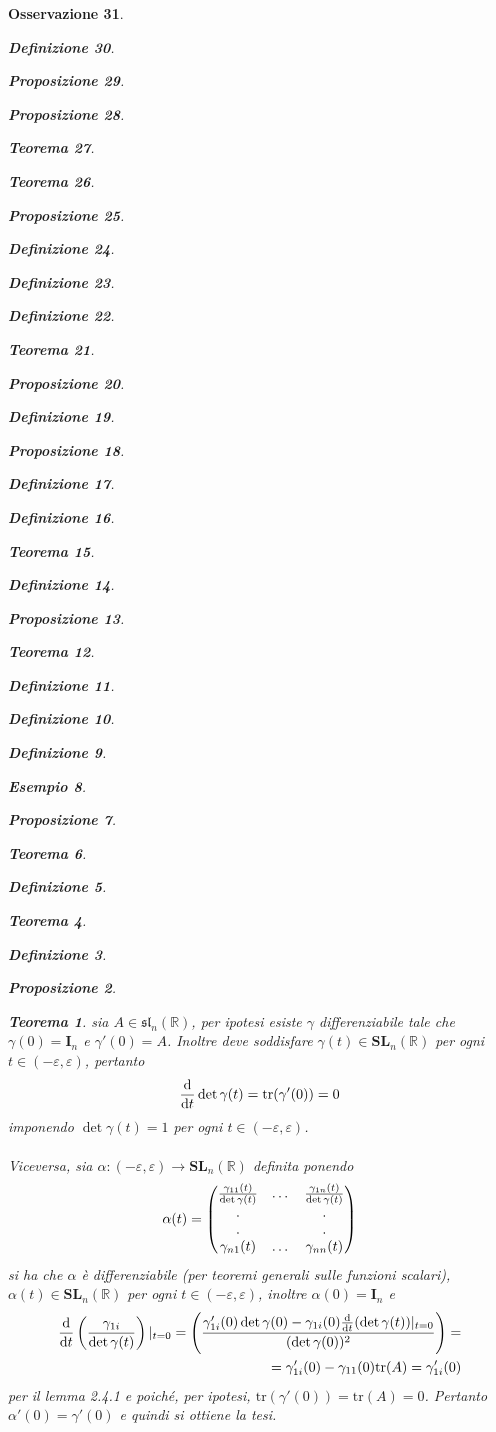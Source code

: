 \documentclass[oneside, 11pt]{amsbook}
\makeatletter
\newcommand{\0}{{(0)}}
\newcommand{\3}{{(3)}}
\theoremstyle{colonplain}
\newtheorem{thm}{Teorema}[chapter]
\newtheorem{prop}[thm]{Proposizione}
\theoremstyle{colondefinition}
\newtheorem{defn}[thm]{Definizione}
\newtheorem{ex}[thm]{Esempio}
\theoremstyle{colonremark}
\newtheorem{rmk}[thm]{Osservazione}
\numberwithin{equation}{chapter}
\renewcommand{\proofname}{Dimostrazione}
\renewenvironment{proof}[1][\proofname]{\par
  \pushQED{\end{proof}}%
  \normalfont \topsep6\p@\@plus6\p@\relax
  \trivlist
  \item[\hskip\labelsep\bfseries #1:]\ignorespaces
}{%
  \popQED\endtrivlist\@endpefalse
}
\makeatother
\begin{document}
\begin{rmk}
\begin{defn}
\begin{prop}
\begin{prop}
\begin{thm}
\begin{thm}
\begin{prop}
\begin{defn}
\begin{defn}
\begin{defn}
\begin{thm}
\begin{prop}
\begin{defn}
\begin{prop}
\begin{defn}
\begin{defn}
\begin{thm}
\begin{defn}
\begin{prop}
\begin{thm}
\begin{defn}
\begin{defn}
\begin{defn}
\begin{ex}
\begin{prop}
\begin{thm}
\begin{defn}
\begin{thm}
\begin{defn}
\begin{prop}
\begin{proof}
\begin{proof}
\begin{proof}
\begin{proof}
\begin{proof}[Soluzione]
\begin{proof}
\begin{proof}
\begin{thm}
\begin{proof} sia $A \in \mathfrak{sl}_n(\mathbb{R})$, per ipotesi esiste $\gamma$ differenziabile tale che $\gamma(0) = \mathbf{I}_n$ e $\gamma'(0) = A$. Inoltre deve soddisfare $\gamma(t) \in \mathbf{SL}_n(\mathbb{R})$ per ogni $t \in (-\varepsilon, \varepsilon)$, pertanto
\begin{align}
    \frac{\mathrm{d}}{\mathrm{d}t} \det \gamma(t) = \mathrm{tr} (\gamma'(0)) = 0 \notag
\end{align}
imponendo $\det \gamma(t) = 1$ per ogni $t \in (-\varepsilon, \varepsilon)$. \\ \\
Viceversa, sia $\alpha : (-\varepsilon, \varepsilon) \longrightarrow \mathbf{SL}_n(\mathbb{R})$ definita ponendo
\begin{align}
    \alpha(t) = \begin{pmatrix}
        \frac{\gamma_{11}(t)}{\det \gamma(t)} & \dots & \frac{\gamma_{1n}(t)}{\det \gamma(t)} \\
        . & & . \\
        . & & . \\
        \gamma_{n1}(t) & \dots & \gamma_{nn}(t)
    \end{pmatrix} \notag
\end{align}
si ha che $\alpha$ è differenziabile (per teoremi generali sulle funzioni scalari), \\$\alpha(t) \in \mathbf{SL}_n(\mathbb{R})$ per ogni $t \in (-\varepsilon, \varepsilon)$, inoltre $\alpha(0) = \mathbf{I}_n$ e
\begin{align}
    \frac{\mathrm{d}}{\mathrm{d}t} \left( \frac{\gamma_{1i}}{\det \gamma(t)} \right)|_{t = 0} = \left( \frac{\gamma'_{1i}(0) \det \gamma(0) - \gamma_{1i}(0) \frac{\mathrm{d}}{\mathrm{d}t} (\det \gamma(t))|_{t = 0}}{(\det \gamma(0))^2} \right) = \notag \\
    =  \gamma'_{1i}(0) - \gamma_{11}(0)\mathrm{tr}(A) = \gamma'_{1i}(0) \notag
\end{align}
per il \textit{lemma 2.4.1} e poiché, per ipotesi, $\mathrm{tr}(\gamma'(0)) = \mathrm{tr}(A) = 0$. Pertanto $\alpha'(0) = \gamma'(0)$ e quindi si ottiene la tesi. \\ \\

\end{proof}
\end{thm}
\end{proof}
\end{proof}
\end{proof}
\end{proof}
\end{proof}
\end{proof}
\end{proof}
\end{prop}
\end{defn}
\end{thm}
\end{defn}
\end{thm}
\end{prop}
\end{ex}
\end{defn}
\end{defn}
\end{defn}
\end{thm}
\end{prop}
\end{defn}
\end{thm}
\end{defn}
\end{defn}
\end{prop}
\end{defn}
\end{prop}
\end{thm}
\end{defn}
\end{defn}
\end{defn}
\end{prop}
\end{thm}
\end{thm}
\end{prop}
\end{prop}
\end{defn}
\end{rmk}
\end{document}
